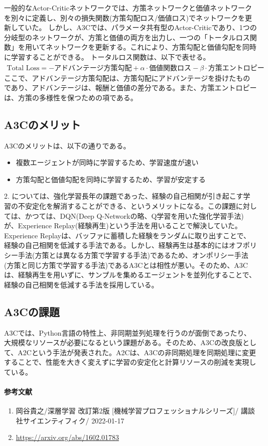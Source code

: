 \documentclass{ltjsarticle}
\begin{document}
一般的なActor-Criticネットワークでは、方策ネットワークと価値ネットワークを別々に定義し、別々の損失関数(方策勾配ロス/価値ロス)でネットワークを更新していた。
しかし、A3Cでは、パラメータ共有型のActor-Criticであり、1つの分岐型のネットワークが、方策と価値の両方を出力し、一つの「トータルロス関数」を用いてネットワークを更新する。これにより、方策勾配と価値勾配を同時に学習することができる。
トータルロス関数は、以下で表せる。
\begin{align}
  \text{Total Loss} = - \text{アドバンテージ方策勾配} + \alpha \cdot \text{価値関数ロス} - \beta \cdot \text{方策エントロピー}
\end{align}
ここで、アドバンテージ方策勾配は、方策勾配にアドバンテージを掛けたものであり、アドバンテージは、報酬と価値の差分である。また、方策エントロピーは、方策の多様性を保つための項である。


\subsection{A3Cのメリット}
A3Cのメリットは、以下の通りである。
\begin{itemize}
  \item 複数エージェントが同時に学習するため、学習速度が速い
  \item 方策勾配と価値勾配を同時に学習するため、学習が安定する
\end{itemize}
2. については、強化学習長年の課題であった、経験の自己相関が引き起こす学習の不安定化を解消することができる、というメリットになる。この課題に対しては、かつては、DQN(Deep Q-Networkの略、Q学習を用いた強化学習手法)が、Experience Replay(経験再生)という手法を用いることで解決していた。Experience Replayは、バッファに蓄積した経験をランダムに取り出すことで、経験の自己相関を低減する手法である。しかし、経験再生は基本的にはオフポリシー手法(方策とは異なる方策で学習する手法)であるため、オンポリシー手法(方策と同じ方策で学習する手法)であるA3Cとは相性が悪い。そのため、A3Cは、経験再生を用いずに、サンプルを集めるエージェントを並列化することで、経験の自己相関を低減する手法を採用している。

\subsection{A3Cの課題}
A3Cでは、Python言語の特性上、非同期並列処理を行うのが面倒であったり、大規模なリソースが必要になるという課題がある。そのため、A3Cの改良版として、A2Cという手法が発表された。A2Cは、A3Cの非同期処理を同期処理に変更することで、性能を大きく変えずに学習の安定化と計算リソースの削減を実現している。


\clearpage
\paragraph{参考文献}
\begin{enumerate}
  \item 岡谷貴之/深層学習 改訂第2版 [機械学習プロフェッショナルシリーズ]/ 講談社サイエンティフィク/ 2022-01-17
  \item \url{https://arxiv.org/abs/1602.01783}
\end{enumerate}

\newpage
\end{document}
